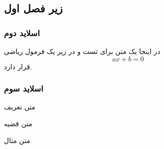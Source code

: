 \documentclass[babel={layout=lists},9pt]{beamer-rl}
\begin{document}
	
	\subsection{زیر فصل اول}
	
	
	\begin{frame}
		\frametitle{اسلاید دوم}
		در اینجا یک متن برای تست و در زیر یک فرمول ریاضی
		\begin{equation*}
		a x + b = 0
		\end{equation*}
		قرار دارد.
	\end{frame}
	
	
	\begin{frame}
		\frametitle{اسلاید سوم}
		
		\begin{definition}
			متن تعریف
		\end{definition}
		
		\vspace{15pt} %
		
		\begin{theorem}
			متن قضیه
		\end{theorem}
		
		\begin{example}
			متن مثال
		\end{example}
		
	\end{frame}
	
\end{document}
